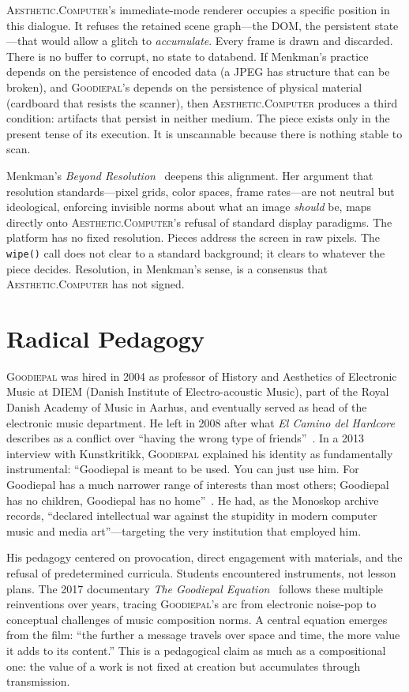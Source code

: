\documentclass[10pt,letterpaper,twocolumn]{article}
\newcommand{\ac}{\textsc{Aesthetic.Computer}}
\newcommand{\gp}{\textsc{Goodiepal}}
\begin{document}
\ac{}'s immediate-mode renderer occupies a specific position in this dialogue. It refuses the retained scene graph---the DOM, the persistent state---that would allow a glitch to \emph{accumulate}. Every frame is drawn and discarded. There is no buffer to corrupt, no state to databend. If Menkman's practice depends on the persistence of encoded data (a JPEG has structure that can be broken), and \gp{}'s depends on the persistence of physical material (cardboard that resists the scanner), then \ac{} produces a third condition: artifacts that persist in neither medium. The piece exists only in the present tense of its execution. It is unscannable because there is nothing stable to scan.

Menkman's \emph{Beyond Resolution}~\citep{menkman2020resolution} deepens this alignment. Her argument that resolution standards---pixel grids, color spaces, frame rates---are not neutral but ideological, enforcing invisible norms about what an image \emph{should} be, maps directly onto \ac{}'s refusal of standard display paradigms. The platform has no fixed resolution. Pieces address the screen in raw pixels. The \texttt{wipe()} call does not clear to a standard background; it clears to whatever the piece decides. Resolution, in Menkman's sense, is a consensus that \ac{} has not signed.

\section{Radical Pedagogy}

\gp{} was hired in 2004 as professor of History and Aesthetics of Electronic Music at DIEM (Danish Institute of Electro-acoustic Music), part of the Royal Danish Academy of Music in Aarhus, and eventually served as head of the electronic music department. He left in 2008 after what \emph{El Camino del Hardcore} describes as a conflict over ``having the wrong type of friends''~\citep{goodiepal2012elcamino}. In a 2013 interview with Kunstkritikk, \gp{} explained his identity as fundamentally instrumental: ``Goodiepal is meant to be used. You can just use him. For Goodiepal has a much narrower range of interests than most others; Goodiepal has no children, Goodiepal has no home''~\citep{kunstkritikk2013goodiepal}. He had, as the Monoskop archive records, ``declared intellectual war against the stupidity in modern computer music and media art''---targeting the very institution that employed him.

His pedagogy centered on provocation, direct engagement with materials, and the refusal of predetermined curricula. Students encountered instruments, not lesson plans. The 2017 documentary \emph{The Goodiepal Equation}~\citep{sanpakkila2017equation} follows these multiple reinventions over years, tracing \gp{}'s arc from electronic noise-pop to conceptual challenges of music composition norms. A central equation emerges from the film: ``the further a message travels over space and time, the more value it adds to its content.'' This is a pedagogical claim as much as a compositional one: the value of a work is not fixed at creation but accumulates through transmission.
\end{document}
